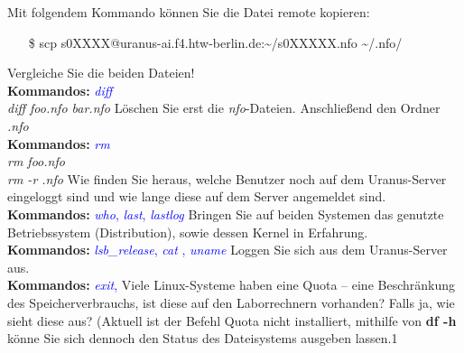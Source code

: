 \documentclass[paper=a4,fontsize=11pt]{scrartcl}%
\numberwithin{equation}{section}
\begin{document}
{\begin{enumerate}
\begin{tasks}
           Mit folgendem Kommando können Sie die Datei remote kopieren: 
           \begin{itemize}
          \item[\$]scp s0XXXX@uranus-ai.f4.htw-berlin.de:\textasciitilde /s0XXXXX.nfo \textasciitilde/.nfo/
          \end{itemize}
          \task Vergleiche Sie die beiden Dateien!\\
          \textbf{Kommandos:} \textcolor{blue}{\emph{diff}}\\
          \textit{diff foo.nfo bar.nfo}
          \task Löschen Sie erst die \emph{nfo}-Dateien. Anschließend den Ordner \emph{.nfo}\\
          \textbf{Kommandos:} \textcolor{blue}{\emph{rm}}\\
           \textit{rm foo.nfo}\\
          \textit{rm -r .nfo}
          \task Wie finden Sie heraus, welche Benutzer noch auf dem Uranus-Server eingeloggt sind und wie lange diese auf dem Server angemeldet sind.\\
          \textbf{Kommandos:} \textcolor{blue}{\emph{who}, \emph{last}, \emph{lastlog}}
          \task Bringen Sie auf beiden Systemen das genutzte Betriebssystem (Distribution), sowie dessen Kernel in Erfahrung.\\
          \textbf{Kommandos:} \textcolor{blue}{\emph{lsb\_release}, \emph{cat }, \emph{uname}}
          \task Loggen Sie sich aus dem Uranus-Server aus.\\
          \textbf{Kommandos:} \textcolor{blue}{\emph{exit}, }
          \task Viele Linux-Systeme haben eine Quota -- eine Beschränkung des Speicherverbrauchs, ist diese auf den Laborrechnern vorhanden? Falls ja, wie sieht diese aus? (Aktuell ist der Befehl Quota nicht installiert, mithilfe von \textbf{df -h} könne Sie sich dennoch den Status des Dateisystems ausgeben lassen.1
        \end{tasks}
\end{enumerate}

}
\end{document}
